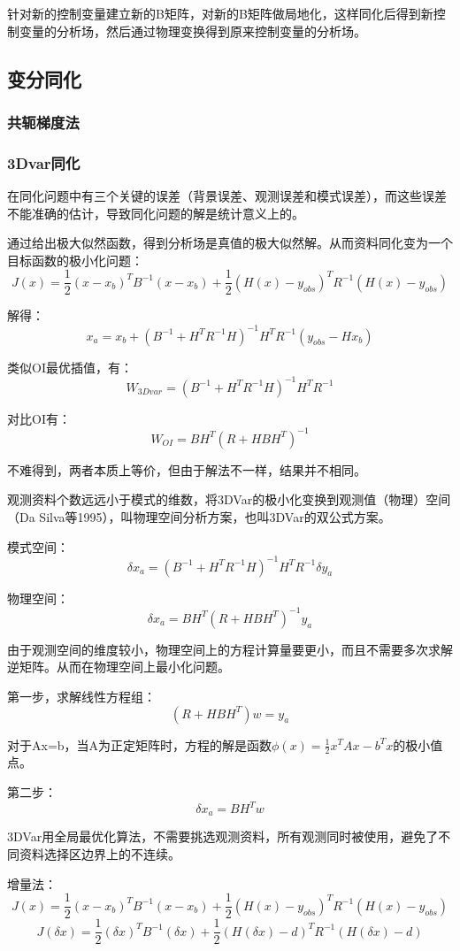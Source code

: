 \documentclass{article}
\begin{document}
针对新的控制变量建立新的B矩阵，对新的B矩阵做局地化，这样同化后得到新控制变量的分析场，然后通过物理变换得到原来控制变量的分析场。

\subsection{变分同化}
\subsubsection{共轭梯度法}
\subsubsection{3Dvar同化}

在同化问题中有三个关键的误差（背景误差、观测误差和模式误差），而这些误差不能准确的估计，导致同化问题的解是统计意义上的。

通过给出极大似然函数，得到分析场是真值的极大似然解。从而资料同化变为一个目标函数的极小化问题：
$$J(x) = \frac{1}{2}(x-x_b)^{T}B^{-1}(x-x_b) + \frac{1}{2}(H(x)-y_{obs})^{T}R^{-1}(H(x)-y_{obs})$$

解得：
$$x_a = x_b + (B^{-1} + H^TR^{-1}H)^{-1}H^TR^{-1}(y_{obs} - Hx_b)$$

类似OI最优插值，有：
$$W_{3Dvar} = (B^{-1} + H^TR^{-1}H)^{-1}H^TR^{-1}$$

对比OI有：
$$W_{OI} = BH^T(R + HBH^T)^{-1}$$

不难得到，两者本质上等价，但由于解法不一样，结果并不相同。

观测资料个数远远小于模式的维数，将3DVar的极小化变换到观测值（物理）空间（Da Silva等1995），叫物理空间分析方案，也叫3DVar的双公式方案。

模式空间：
$$\delta x_a=(B^{-1} + H^TR^{-1}H)^{-1}H^TR^{-1}\delta y_a$$

物理空间：
$$\delta x_a = BH^T(R + HBH^T)^{-1}y_a$$

由于观测空间的维度较小，物理空间上的方程计算量要更小，而且不需要多次求解逆矩阵。从而在物理空间上最小化问题。

第一步，求解线性方程组：
$$(R + HBH^T)w = y_a$$

对于Ax=b，当A为正定矩阵时，方程的解是函数$\phi(x) = \frac{1}{2}x^TAx - b^Tx$的极小值点。

第二步：
$$\delta x_a = BH^T w$$

3DVar用全局最优化算法，不需要挑选观测资料，所有观测同时被使用，避免了不同资料选择区边界上的不连续。

增量法：
$$J(x) = \frac{1}{2}(x-x_b)^{T}B^{-1}(x-x_b) + \frac{1}{2}(H(x)-y_{obs})^{T}R^{-1}(H(x)-y_{obs})$$
$$J(\delta x) = \frac{1}{2}(\delta x)^{T}B^{-1}(\delta x) + \frac{1}{2}(H(\delta x)-d)^{T}R^{-1}(H(\delta x)-d)$$
\end{document}
